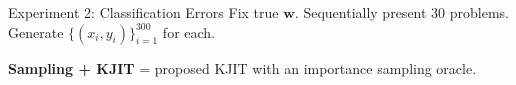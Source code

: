 \documentclass[english]{beamer}
\begin{document}
\begin{frame}
\begin{columns}[t]
\begin{block}{ Experiment 2: Classification Errors}
    Fix true $\boldsymbol{w}$. Sequentially present 30 problems. Generate
    $\{(x_i, y_i)\}_{i=1}^{300}$ for each.  
\begin{figure}[ht]
    \vspace{5mm}
  \centering
  \hspace{3cm}
  \label{fig:logistic_performance}
\end{figure}

\textbf{Sampling + KJIT} = proposed KJIT with an importance sampling oracle.


\end{block}
\end{columns}
\end{frame}
\end{document}

